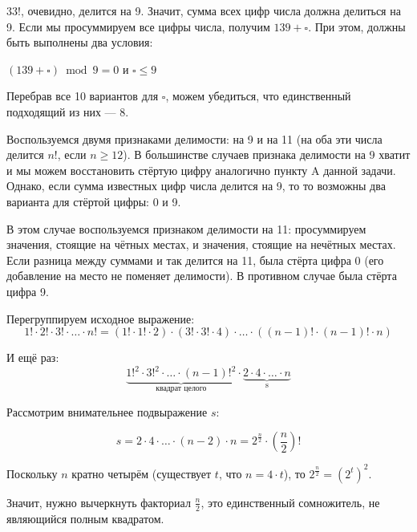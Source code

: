 \begin{itemize}
\itA $33!$, очевидно, делится на 9. Значит, сумма всех цифр числа должна делиться на 9.
Если мы просуммируем все цифры числа, получим $139+\square$. При этом, должны быть выполнены
два условия:
\begin{center} 
$(139+\square) \bmod 9 = 0$ и $\square \le 9$
\end{center}

Перебрав все 10 вариантов
для $\square$, можем убедиться, что единственный подходящий из них --- 8.

\itB Воспользуемся двумя признаками делимости: на 9 и на 11 (на оба эти числа делится $n!$, если $n \ge 12$).
В большинстве случаев признака делимости на 9 хватит и мы можем восстановить стёртую цифру аналогично
пункту A данной задачи. Однако, если сумма известных цифр числа делится на 9, то
то возможны два варианта для стёртой цифры: 0 и 9.

В этом случае воспользуемся признаком делимости на 11: просуммируем значения, стоящие на чётных местах,
и значения, стоящие на нечётных местах. Если разница между суммами и так делится на 11, была стёрта цифра 0
(его добавление на место не поменяет делимости). В противном случае была стёрта цифра 9.

\itC Перегруппируем исходное выражение:
$$1! \cdot 2! \cdot 3! \cdot \ldots \cdot n! = (1! \cdot 1! \cdot 2) \cdot (3! \cdot 3! \cdot 4) \cdot \ldots \cdot ((n-1)! \cdot (n-1)! \cdot n)$$

И ещё раз:
$$\underbrace{1!^2 \cdot 3!^2 \cdot \ldots \cdot (n-1)!^2}_\textrm{квадрат целого} \cdot \underbrace{2 \cdot 4 \cdot \ldots \cdot n}_\textrm{s}$$

Рассмотрим внимательнее подвыражение $s$:

$$s = 2 \cdot 4 \cdot \ldots \cdot (n-2) \cdot n = 2^{\frac{n}{2}} \cdot \left(\frac{n}{2}\right)!$$

Поскольку $n$ кратно четырём (существует $t$, что $n = 4\cdot t$), то 
$2^{\frac{n}{2}} = (2^t)^2$.

Значит, нужно вычеркнуть факториал $\frac{n}{2}$, это единственный сомножитель, не являющийся полным квадратом.

\end{itemize}
